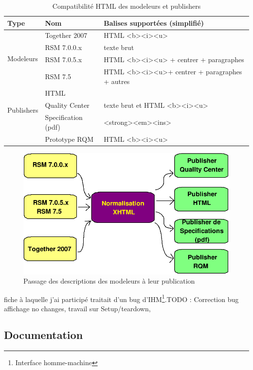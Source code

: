 \begin{table}[!ht]
\caption{\label{tableau:compatDescHTML}Compatibilité HTML des modeleurs et publishers}
\begin{tabular}{|l|l|l|}
  \hline
  Type & Nom & Balises supportées (simplifié) \\
  \hline
  \hline
  \multirow{4}{*}{Modeleurs} & Together 2007 & HTML <b><i><u> \\
    & RSM 7.0.0.x & texte brut\\
    & RSM 7.0.5.x & HTML <b><i><u> + centrer + paragraphes\\ 
   & RSM 7.5 &  HTML <b><i><u>+ centrer + paragraphes + autres\\ \hline
  \multirow{3}{*}{Publishers} & HTML &  \\
    & Quality Center & texte brut et HTML <b><i><u> \\
    & Specification (pdf) & <strong><em><ins>  \\
    & Prototype RQM &  HTML <b><i><u> \\ \hline
\end{tabular}
\end{table}


\begin{figure}[!ht]
\centering
\includegraphics[scale=0.5]{Illustrations/bigDescSchema.png}
\caption{Passage des descriptions des modeleurs à leur publication}
\label{figure:descXHTMLPublisher}
\end{figure}





fiche à laquelle j'ai participé traitait d'un bug d'IHM\footnote{Interface homme-machine}.TODO : Correction bug affichage no changes, travail sur Setup/teardown, 
\subsection{Documentation}

